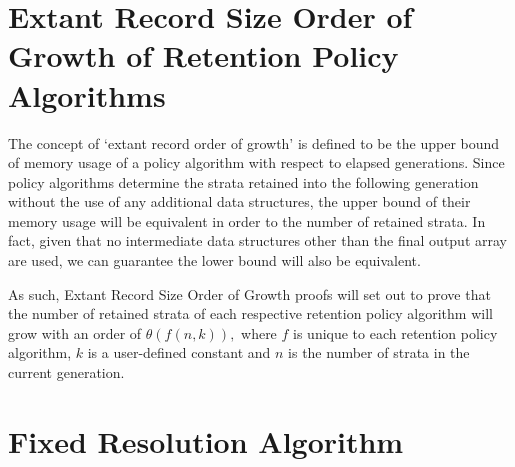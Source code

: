 \printunsrtglossary[numberedsection=autolabel]

\section{Extant Record Size Order of Growth of Retention Policy Algorithms} \label{sec:extant_record_oog}
The concept of `extant record order of growth' is defined to be the upper bound of memory usage of a policy algorithm with respect to elapsed generations.
Since policy algorithms determine the strata retained into the following generation without the use of any additional data structures, the upper bound of their memory usage will be equivalent in order to the number of retained strata.
In fact, given that no intermediate data structures other than the final output array are used, we can guarantee the lower bound will also be equivalent.

As such, Extant Record Size Order of Growth proofs will set out to prove that the number of retained strata of each respective retention policy algorithm will grow with an order of $\mathcal{\theta}(f(n, k)),$ where $f$ is unique to each retention policy algorithm, $k$ is a user-defined constant and $n$ is the number of strata in the current generation.

\section{Fixed Resolution Algorithm}




